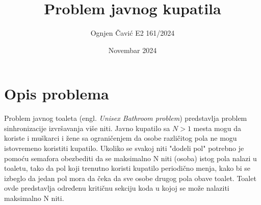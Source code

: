 \documentclass[11pt]{article}
\title{Problem javnog kupatila}
\author{Ognjen Čavić E2 161/2024}
\date{Novembar 2024}
\begin{document}
	\maketitle
	\section{Opis problema}
	\par Problem javnog toaleta (engl. \textit{Unisex Bathroom problem})
	predstavlja problem sinhronizacije izvršavanja više niti.
	Javno kupatilo sa $N > 1$ mesta mogu da koriste i muškarci i žene sa
	ograničenjem da osobe različitog pola ne mogu istovremeno koristiti
	kupatilo.
	Ukoliko se svakoj niti "dodeli pol" potrebno je pomoću semafora obezbediti
	da se maksimalno N niti (osoba) istog pola nalazi u toaletu, tako da
	pol koji trenutno koristi kupatilo periodično menja, kako bi se izbeglo
	da jedan pol mora da čeka da sve osobe drugog pola obave toalet.
	Toalet ovde predstavlja određenu kritičnu sekciju koda u kojoj se može
	nalaziti maksimalno N niti.
\end{document}
